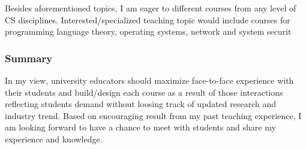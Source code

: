 \documentclass[letterpaper, 10pt]{article}
\begin{document}
\begin{small}
Besides aforementioned topics, I am eager to different courses from any level
of CS disciplines. Interested/specialized teaching topic would include courses
for programming language theory, operating systems, network and system
securit

\subsubsection*{Summary}

In my view, university educators should maximize face-to-face experience with
their students and build/design each course as a result of those interactions
reflecting students demand without loosing track of updated research and
industry trend.
%
Based on encouraging result from my past teaching experience, I am looking
forward to have a chance to meet with students and share my experience and
knowledge. 

\end{small}
\end{document}

